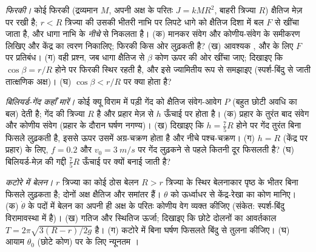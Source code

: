 \begin{exercise}[$\star\star\star$]\label{exo:b2:rigid-body-mechanics:10}
\emph{फिरकी।} कोई फिरकी (द्रव्यमान $M$, अपनी अक्ष के परितः  $J = kMR^2$,
बाहरी त्रिज्या $R$) क्षैतिज मेज़ पर रखी है; $r < R$ त्रिज्या की उसकी
भीतरी नाभि पर लिपटे धागे को क्षैतिज दिशा में बल
$F$ से खींचा जाता है, और धागा नाभि के \emph{नीचे} से निकलता है। (क)
 मानकर संवेग और कोणीय-संवेग के
समीकरण लिखिए और केंद्र का त्वरण निकालिए; फिरकी किस ओर
लुढ़कती है? (ख) आवश्यक , और  के लिए $F$ पर
प्रतिबंध। (ग) वही प्रश्न, जब धागा क्षैतिज से
$\beta$ कोण ऊपर की ओर खींचा जाए; दिखाइए कि $\cos\beta = r/R$ होने पर
फिरकी स्थिर रहती है, और इसे ज्यामितीय रूप से समझाइए (स्पर्श-बिंदु से
जाती तात्क्षणिक अक्ष)। (घ) $\cos\beta < r/R$ पर क्या होता है?
\end{exercise}

\begin{exercise}[$\star\star\star$]\label{exo:b2:rigid-body-mechanics:11}
\emph{बिलियर्ड-गेंद कहाँ मारें।} कोई क्यू विराम में पड़ी गेंद को क्षैतिज
संवेग-आवेग $P$ (बहुत छोटी अवधि का बल) देती है; गेंद की त्रिज्या $R$ है
और प्रहार मेज़ से $h$ ऊँचाई पर होता है। (क) प्रहार के तुरंत बाद संवेग और कोणीय संवेग
(प्रहार के दौरान घर्षण नगण्य)। (ख) दिखाइए कि $h = \tfrac75R$ होने पर गेंद
तुरंत बिना फिसले लुढ़कती है, इससे ऊपर उसमें अग्र-चक्रण होता है और
नीचे पश्च-चक्रण। (ग) $h = R$ (केंद्र पर प्रहार) के लिए, $f = 0.2$ और
$v_0 = \qty{3}{m/s}$ पर गेंद लुढ़कने से पहले कितनी दूर फिसलती है? (घ)
बिलियर्ड-मेज़ की गद्दी $\tfrac75R$ ऊँचाई पर क्यों बनाई जाती है?
\end{exercise}

\begin{exercise}[$\star\star\star$]\label{exo:b2:rigid-body-mechanics:12}
\emph{कटोरे में बेलन।} $r$ त्रिज्या का कोई ठोस बेलन $R > r$ त्रिज्या के
स्थिर बेलनाकार पृष्ठ के भीतर बिना फिसले लुढ़कता है; दोनों अक्ष
क्षैतिज और समांतर हैं। $\theta$ को ऊर्ध्वाधर से केंद्र-रेखा का कोण
मानिए। (क) $\dot\theta$ के पदों में बेलन का अपनी ही अक्ष के परितः कोणीय
वेग व्यक्त कीजिए (संकेत: स्पर्श-बिंदु
विरामावस्था में है)। (ख) गतिज और स्थितिज ऊर्जा; दिखाइए कि छोटे दोलनों का
आवर्तकाल $T = 2\pi\sqrt{3(R - r)/2g}$ है। (ग) कटोरे में बिना घर्षण फिसलते
बिंदु से तुलना कीजिए। (घ) आयाम $\theta_0$ (छोटे कोण) पर  के लिए न्यूनतम ।
\end{exercise}

